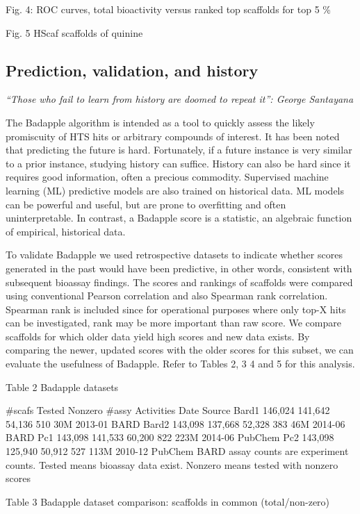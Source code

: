 Fig. 4: ROC curves, total bioactivity versus ranked top scaffolds for top 5 \%

Fig. 5 HScaf scaffolds of quinine

\subsection{Prediction, validation, and history}

\emph{“Those who fail to learn from history are doomed to repeat it”: George Santayana}

The Badapple algorithm is intended as a tool to quickly assess the likely promiscuity of HTS hits or arbitrary compounds of interest. It has been noted that predicting the future is hard. Fortunately, if a future instance is very similar to a prior instance, studying history can suffice. History can also be hard since it requires good information, often a precious commodity. Supervised machine learning (ML) predictive models are also trained on historical data. ML models can be powerful and useful, but are prone to overfitting and often uninterpretable. In contrast, a Badapple score is a statistic, an algebraic function of empirical, historical data.

To validate Badapple we used retrospective datasets to indicate whether scores generated in the past would have been predictive, in other words, consistent with subsequent bioassay findings. The scores and rankings of scaffolds were compared using conventional Pearson correlation and also Spearman rank correlation. Spearman rank is included since for operational purposes where only top-X hits can be investigated, rank may be more important than raw score. We compare scaffolds for which older data yield high scores and new data exists. By comparing the newer, updated scores with the older scores for this subset, we can evaluate the usefulness of Badapple. Refer to Tables 2, 3 4 and 5 for this analysis.

Table 2 Badapple datasets




\#scafs
Tested
Nonzero
\#assy
Activities
Date
Source
Bard1
146,024
141,642
54,136
510
30M
2013-01
BARD
Bard2
143,098
137,668
52,328
383
46M
2014-06
BARD
Pc1
143,098
141,533
60,200
822
223M
2014-06
PubChem
Pc2
143,098
125,940
50,912
527
113M
2010-12
PubChem
BARD assay counts are experiment counts. Tested means bioassay data exist. Nonzero means tested with nonzero scores


Table 3 Badapple dataset comparison: scaffolds in common (total/non-zero)


